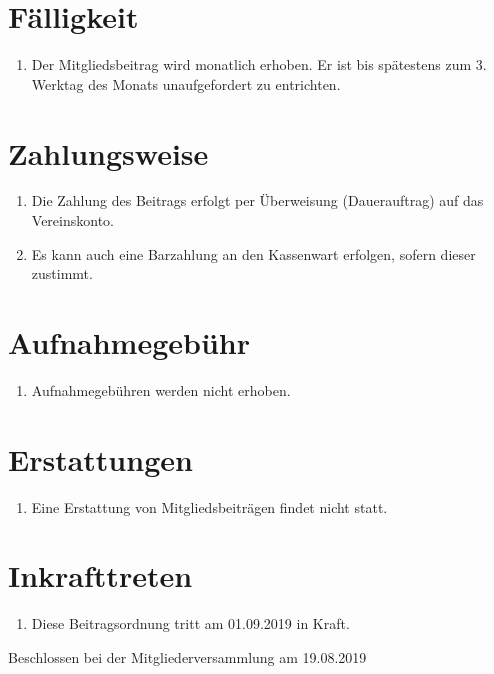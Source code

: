 \documentclass[a4paper, 12pt]{scrartcl}
\begin{document}
\section{Fälligkeit}
\begin{enumerate}
	\item Der Mitgliedsbeitrag wird monatlich erhoben. Er ist bis spätestens zum 3. Werktag des Monats unaufgefordert zu entrichten.
\end{enumerate}

\section{Zahlungsweise}
\begin{enumerate}
	\item Die Zahlung des Beitrags erfolgt per Überweisung (Dauerauftrag) auf das Vereinskonto.
	\item Es kann auch eine Barzahlung an den Kassenwart erfolgen, sofern dieser zustimmt.
\end{enumerate}

\section{Aufnahmegebühr}
\begin{enumerate}
	\item Aufnahmegebühren werden nicht erhoben.
\end{enumerate}

\section{Erstattungen}
\begin{enumerate}
	\item Eine Erstattung von Mitgliedsbeiträgen findet nicht statt.
\end{enumerate}

\section{Inkrafttreten}
\begin{enumerate}
	\item Diese Beitragsordnung tritt am 01.09.2019 in Kraft.
\end{enumerate}


\vspace{2.5cm}

\noindent Beschlossen bei der Mitgliederversammlung am 19.08.2019

\end{document}
